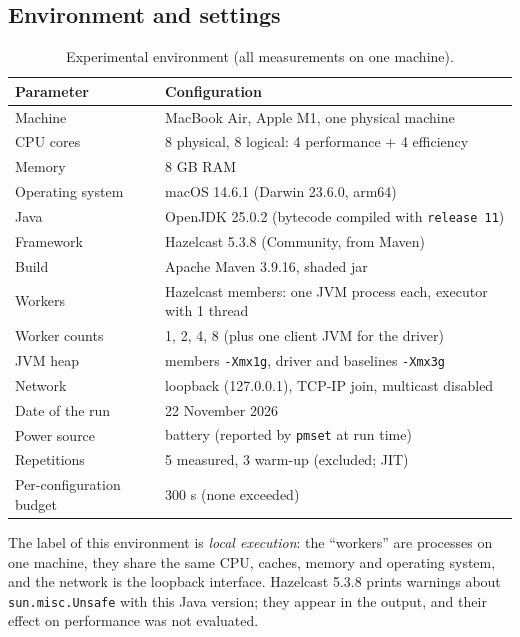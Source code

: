 \documentclass[11pt,a4paper]{article}
\begin{document}
\subsection{Environment and settings}
\begin{table}[H]
\centering
\caption{Experimental environment (all measurements on one machine).}
\begin{tabular}{@{}ll@{}}
\toprule
Parameter & Configuration \\
\midrule
Machine & MacBook Air, Apple M1, one physical machine \\
CPU cores & 8 physical, 8 logical: 4 performance + 4 efficiency \\
Memory & 8 GB RAM \\
Operating system & macOS 14.6.1 (Darwin 23.6.0, arm64) \\
Java & OpenJDK 25.0.2 (bytecode compiled with \texttt{release 11}) \\
Framework & Hazelcast 5.3.8 (Community, from Maven) \\
Build & Apache Maven 3.9.16, shaded jar \\
Workers & Hazelcast members: one JVM process each, executor with 1 thread \\
Worker counts & 1, 2, 4, 8 (plus one client JVM for the driver) \\
JVM heap & members \texttt{-Xmx1g}, driver and baselines \texttt{-Xmx3g} \\
Network & loopback (127.0.0.1), TCP-IP join, multicast disabled \\
Date of the run & 22 November 2026 \\
Power source & battery (reported by \texttt{pmset} at run time) \\
Repetitions & 5 measured, 3 warm-up (excluded; JIT) \\
Per-configuration budget & 300 s (none exceeded) \\
\bottomrule
\end{tabular}
\end{table}
The label of this environment is \emph{local execution}: the ``workers'' are processes on one
machine, they share the same CPU, caches, memory and operating system, and the network is the
loopback interface. Hazelcast 5.3.8 prints warnings about \texttt{sun.misc.Unsafe} with this
Java version; they appear in the output, and their effect on performance was not evaluated.
\end{document}
